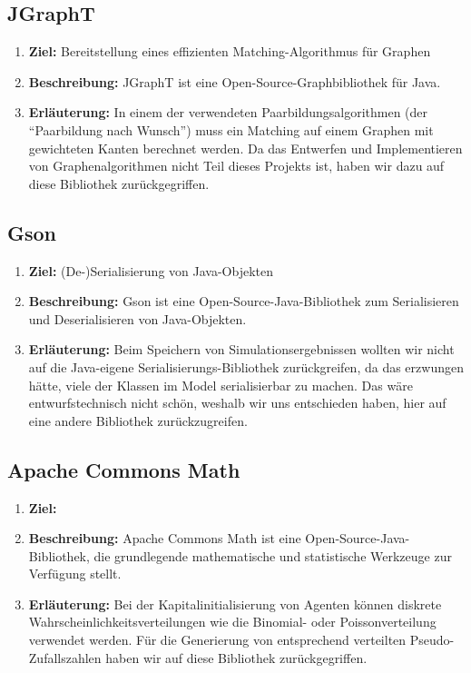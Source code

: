 \documentclass[parskip=full,11pt]{scrartcl}
\begin{document}
\subsection{JGraphT}
\begin{enumerate}
\item[] \textbf{Ziel:} Bereitstellung eines effizienten Matching-Algorithmus für Graphen
\item[] \textbf{Beschreibung:} JGraphT ist eine Open-Source-Graphbibliothek für Java.
\item[] \textbf{Erläuterung:} In einem der verwendeten Paarbildungsalgorithmen (der \enquote{Paarbildung nach Wunsch}) muss ein Matching auf einem Graphen mit gewichteten Kanten berechnet werden. Da das Entwerfen und Implementieren von Graphenalgorithmen nicht Teil dieses Projekts ist, haben wir dazu auf diese Bibliothek zurückgegriffen.
\end{enumerate}
\subsection{Gson}
\begin{enumerate}
\item[] \textbf{Ziel:} (De-)Serialisierung von Java-Objekten
\item[] \textbf{Beschreibung:} Gson ist eine Open-Source-Java-Bibliothek zum Serialisieren und Deserialisieren von Java-Objekten.
\item[] \textbf{Erläuterung:} Beim Speichern von Simulationsergebnissen wollten wir nicht auf die Java-eigene Serialisierungs-Bibliothek zurückgreifen, da das erzwungen hätte, viele der Klassen im Model serialisierbar zu machen. Das wäre entwurfstechnisch nicht schön, weshalb wir uns entschieden haben, hier auf eine andere Bibliothek zurückzugreifen.
\end{enumerate}
\subsection{Apache Commons Math}
\begin{enumerate}
\item[] \textbf{Ziel:} 
\item[] \textbf{Beschreibung:} Apache Commons Math ist eine Open-Source-Java-Bibliothek, die grundlegende mathematische und statistische Werkzeuge zur Verfügung stellt.
\item[] \textbf{Erläuterung:} Bei der Kapitalinitialisierung von Agenten können diskrete Wahrscheinlichkeitsverteilungen wie die Binomial- oder Poissonverteilung verwendet werden. Für die Generierung von entsprechend verteilten Pseudo-Zufallszahlen haben wir auf diese Bibliothek zurückgegriffen.
\end{enumerate}
\end{document}

